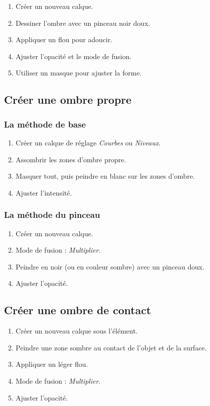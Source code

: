 \begin{enumerate}
    \item Créer un nouveau calque.
    \item Dessiner l'ombre avec un pinceau noir doux.
    \item Appliquer un flou pour adoucir.
    \item Ajuster l'opacité et le mode de fusion.
    \item Utiliser un masque pour ajuster la forme.
\end{enumerate}

\subsection{Créer une ombre propre}

\subsubsection{La méthode de base}

\begin{enumerate}
    \item Créer un calque de réglage \emph{Courbes} ou \emph{Niveaux}.
    \item Assombrir les zones d'ombre propre.
    \item Masquer tout, puis peindre en blanc sur les zones d'ombre.
    \item Ajuster l'intensité.
\end{enumerate}

\subsubsection{La méthode du pinceau}

\begin{enumerate}
    \item Créer un nouveau calque.
    \item Mode de fusion : \emph{Multiplier}.
    \item Peindre en noir (ou en couleur sombre) avec un pinceau doux.
    \item Ajuster l'opacité.
\end{enumerate}

\subsection{Créer une ombre de contact}

\begin{enumerate}
    \item Créer un nouveau calque sous l'élément.
    \item Peindre une zone sombre au contact de l'objet et de la surface.
    \item Appliquer un léger flou.
    \item Mode de fusion : \emph{Multiplier}.
    \item Ajuster l'opacité.
\end{enumerate}

